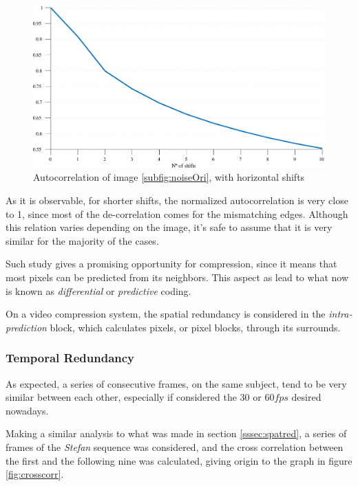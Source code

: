 \begin{figure}[h]
    \centering
    \includegraphics[width=\textwidth]{Sections/3AV1/Diagrams/intracorr.eps}
    \caption{Autocorrelation of image \ref{subfig:noiseOri}, with horizontal shifts}
    \label{fig:autocorr}
\end{figure}

As it is observable, for shorter shifts, the normalized autocorrelation is very close to 1, since most of the de-correlation comes for the mismatching edges. Although this relation varies depending on the image, it's safe to assume that it is very similar for the majority of the cases.

Such study gives a promising opportunity for compression, since it means that most pixels can be predicted from its neighbors. This aspect as lead to what now is known as \emph{differential} or \emph{predictive} coding.

On a video compression system, the spatial redundancy is considered in the \emph{intra-prediction} block, which calculates pixels, or pixel blocks, through its surrounds.

\subsubsection{Temporal Redundancy}

As expected, a series of consecutive frames, on the same subject, tend to be very similar between each other, especially if considered the $30$ or $60 fps$ desired nowadays. 

Making a similar analysis to what was made in section \ref{sssec:spatred}, a series of frames of the \emph{Stefan} sequence \cite{YUVSequences} was considered, and the cross correlation between the first and the following nine was calculated, giving origin to the graph in figure \ref{fig:crosscorr}.

